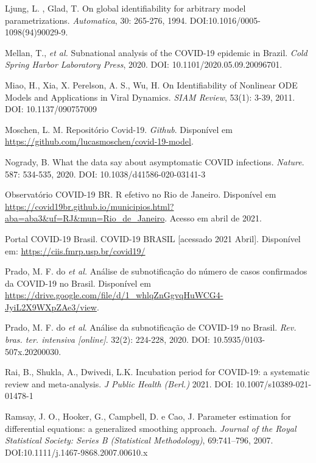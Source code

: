 Ljung, L. , Glad, T. On global identifiability for arbitrary model
parametrizations. {\it Automatica}, 30: 265-276, 1994.
DOI:10.1016/0005-1098(94)90029-9.

Mellan, T., {\it et al.} Subnational analysis of the COVID-19 epidemic in
Brazil. {\it Cold Spring Harbor Laboratory Press}, 2020. DOI:
10.1101/2020.05.09.20096701. 

Miao, H., Xia, X. Perelson, A. S., Wu, H. On Identifiability of Nonlinear ODE Models and Applications in Viral Dynamics.
{\it SIAM Review}, 53(1): 3-39, 2011. DOI: 10.1137/090757009

Moschen, L. M. Repositório Covid-19. {\it Github}. Disponível em \url{https://github.com/lucasmoschen/covid-19-model}.

Nogrady, B. What the data say about asymptomatic COVID infections. {\it
Nature}. 587: 534-535, 2020. DOI: 10.1038/d41586-020-03141-3

Observatório COVID-19 BR. R efetivo no Rio de Janeiro. Disponível em
\url{https://covid19br.github.io/municipios.html?aba=aba3&uf=RJ&mun=Rio_de_Janeiro}.
Acesso em abril de 2021. 

Portal COVID-19 Brasil. COVID-19 BRASIL [acessado 2021 Abril]. Disponível em: \url{https://ciis.fmrp.usp.br/covid19/}

Prado, M. F. do {\it et al.} Análise de subnotificação do número de casos confirmados da COVID-19 no
Brasil. Disponível em
\url{https://drive.google.com/file/d/1_whlqZnGgvqHuWCG4-JyiL2X9WXpZAe3/view}. 

Prado, M. F. do {\it et al}. Análise da subnotificação de COVID-19 no Brasil.
{\it Rev. bras. ter. intensiva [online]}. 32(2): 224-228, 2020. DOI: 10.5935/0103-507x.20200030.


Rai, B., Shukla, A., Dwivedi, L.K. Incubation period for COVID-19: a
systematic review and meta-analysis. {\it J Public Health (Berl.)} 2021. DOI: 10.1007/s10389-021-01478-1

Ramsay, J. O., Hooker, G., Campbell, D. e Cao, J. Parameter estimation for
differential equations: a generalized smoothing approach. {\it Journal of the
Royal Statistical Society: Series B (Statistical Methodology)}, 69:741--796,
2007. DOI:10.1111/j.1467-9868.2007.00610.x

